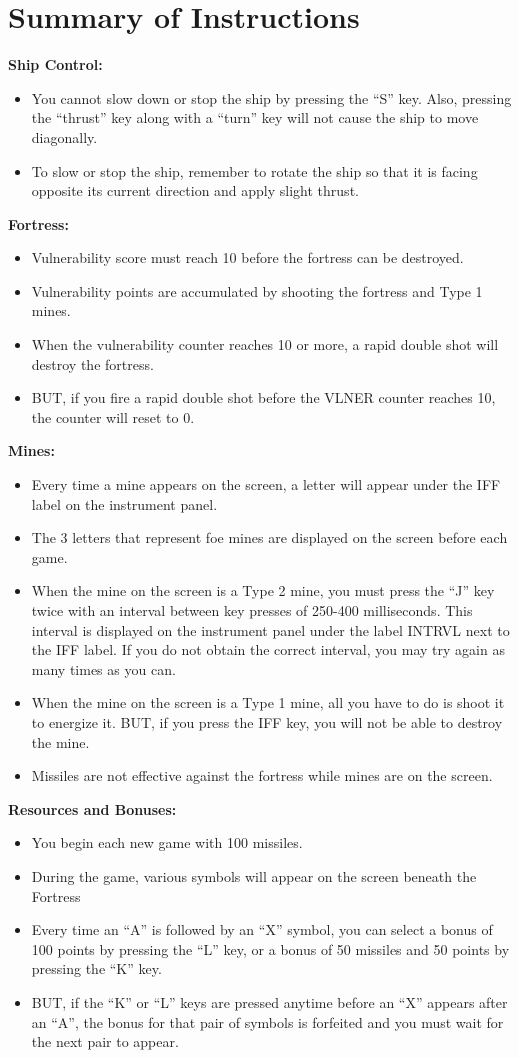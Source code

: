 \documentclass[letterpaper,12pt]{article}
\begin{document}
\section{Summary of Instructions}
\noindent
\textbf{Ship Control:}
\begin{itemize}
\item You cannot slow down or stop the ship by pressing the ``S'' key. Also, pressing the
``thrust'' key along with a ``turn'' key will not cause the ship to move diagonally.
\item To slow or stop the ship, remember to rotate the ship so that it is facing opposite its
current direction and apply slight thrust.
\end{itemize}
\textbf{Fortress:}
\begin{itemize}
\item Vulnerability score must reach 10 before the fortress can be destroyed.
\item Vulnerability points are accumulated by shooting the fortress and Type 1 mines.
\item When the vulnerability counter reaches 10 or more, a rapid double shot will destroy the
fortress.
\item BUT, if you fire a rapid double shot before the VLNER counter reaches 10, the counter
will reset to 0.
\end{itemize}
\textbf{Mines:}
\begin{itemize}
\item Every time a mine appears on the screen, a letter will appear under the IFF label on the
instrument panel.
\item The 3 letters that represent foe mines are displayed on the screen before each game.
\item When the mine on the screen is a Type 2 mine, you must press the ``J'' key twice with
an interval between key presses of 250-400 milliseconds. This interval is displayed on
the instrument panel under the label INTRVL next to the IFF label. If you do not obtain
the correct interval, you may try again as many times as you can.
\item When the mine on the screen is a Type 1 mine, all you have to do is shoot it to energize
it. BUT, if you press the IFF key, you will not be able to destroy the mine.
\item Missiles are not effective against the fortress while mines are on the screen.
\end{itemize}
\textbf{Resources and Bonuses:}
\begin{itemize}
\item You begin each new game with 100 missiles.
\item During the game, various symbols will appear on the screen beneath the Fortress
\item Every time an ``A'' is followed by an ``X'' symbol, you can select a bonus of 100 points
by pressing the ``L'' key, or a bonus of 50 missiles and 50 points by pressing the ``K''
key.
\item BUT, if the ``K'' or ``L'' keys are pressed anytime before an ``X'' appears after an ``A'',
the bonus for that pair of symbols is forfeited and you must wait for the next pair to
appear.
\end{itemize}
\end{document}
